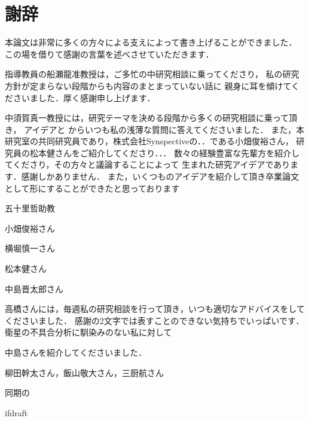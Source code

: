 \documentclass[11pt]{report}
\begin{document}
\fi

\chapter*{謝辞}
本論文は非常に多くの方々による支えによって書き上げることができました．
この場を借りて感謝の言葉を述べさせていただきます．

指導教員の船瀬龍准教授は，ご多忙の中研究相談に乗ってくださり，
私の研究方針が定まらない段階からも内容のまとまっていない話に
親身に耳を傾けてくださいました．厚く感謝申し上げます．

中須賀真一教授には，研究テーマを決める段階から多くの研究相談に乗って頂き，
アイデアと
からいつも私の浅薄な質問に答えてくださいました．
また，本研究室の共同研究員であり，株式会社Synspectiveの．．である小畑俊裕さん，
研究員の松本健さんをご紹介してくださり．．．
数々の経験豊富な先輩方を紹介してくださり，その方々と議論することによって
生まれた研究アイデアであります．感謝しかありません．
また，いくつものアイデアを紹介して頂き卒業論文として形にすることができたと思っております

五十里哲助教

小畑俊裕さん

横堀慎一さん

松本健さん

中島晋太郎さん


高橋さんには，毎週私の研究相談を行って頂き，いつも適切なアドバイスをしてくださいました．
感謝の2文字では表すことのできない気持ちでいっぱいです．
衛星の不具合分析に馴染みのない私に対して

中島さんを紹介してくださいました．

柳田幹太さん，飯山敬大さん，三厨航さん

同期の


\expandafter\ifx\csname ifdraft\endcsname\relax
  
\end{document}
